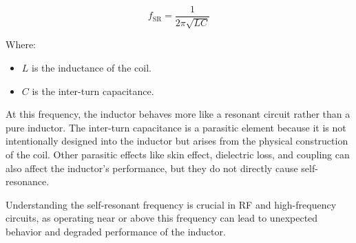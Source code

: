 \[
f_{\text{SR}} = \frac{1}{2\pi\sqrt{LC}}
\]

Where:
\begin{itemize}
    \item \(L\) is the inductance of the coil.
    \item \(C\) is the inter-turn capacitance.
\end{itemize}

At this frequency, the inductor behaves more like a resonant circuit rather than a pure inductor. The inter-turn capacitance is a parasitic element because it is not intentionally designed into the inductor but arises from the physical construction of the coil. Other parasitic effects like skin effect, dielectric loss, and coupling can also affect the inductor's performance, but they do not directly cause self-resonance.

Understanding the self-resonant frequency is crucial in RF and high-frequency circuits, as operating near or above this frequency can lead to unexpected behavior and degraded performance of the inductor.

